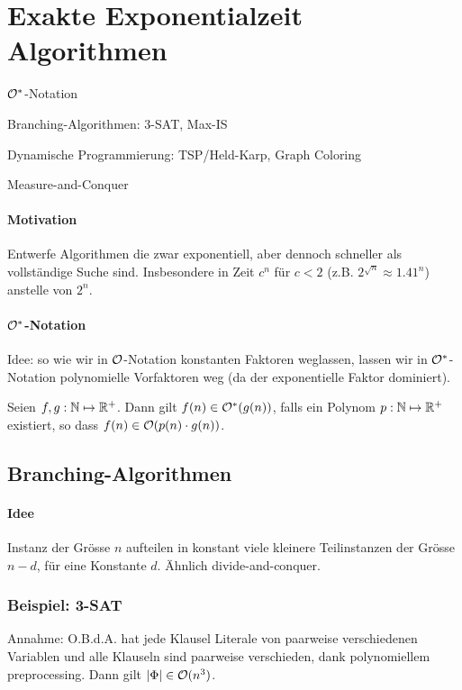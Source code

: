 \section{Exakte Exponentialzeit Algorithmen}

\begin{takeaway}
    \item $\mathcal{O}^*$-Notation
    \item Branching-Algorithmen: 3-SAT, Max-IS
    \item Dynamische Programmierung: TSP/Held-Karp, Graph Coloring
    \item Measure-and-Conquer
\end{takeaway}

\paragraph{Motivation}
Entwerfe Algorithmen die zwar exponentiell, aber dennoch schneller als vollständige Suche sind.
Insbesondere in Zeit $c^n$ für $c < 2$ (z.B. $2^{\sqrt{n}} \approx 1.41^n$) anstelle von $2^n$.

\paragraph{$\mathcal{O}^*$-Notation}
Idee: so wie wir in $\mathcal{O}$-Notation konstanten Faktoren weglassen, lassen wir in $\mathcal{O}^*$-Notation
polynomielle Vorfaktoren weg (da der exponentielle Faktor dominiert).

Seien $f,g : \mathbb{N} \mapsto \mathbb{R}^+$. Dann gilt $f(n) \in \mathcal{O}^*(g(n))$, falls ein Polynom $p : \mathbb{N} \mapsto \mathbb{R}^+$
existiert, so dass $f(n) \in \mathcal{O}(p(n) \cdot g(n))$.


\subsection{Branching-Algorithmen}

\paragraph{Idee}
Instanz der Grösse $n$ aufteilen in konstant viele kleinere Teilinstanzen der Grösse $n-d$, für eine Konstante $d$.
Ähnlich divide-and-conquer.


\subsubsection{Beispiel: 3-SAT}

Annahme: O.B.d.A. hat jede Klausel Literale von paarweise verschiedenen Variablen und alle Klauseln sind
paarweise verschieden, dank polynomiellem preprocessing.
Dann gilt $|\Phi| \in \mathcal{O}(n^3)$.

